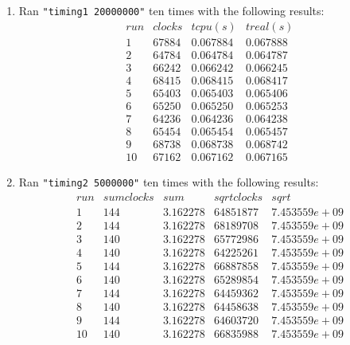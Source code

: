 \documentclass[12pt,fleqn,leqno,letterpaper]{article}
\begin{document}
\begin{enumerate}
    \item Ran \texttt{"timing1 20000000"} ten times with the following
        results:\\
        $$
        \begin{array}{lccc}
            run & clocks & t cpu (s) & t real (s) \\
            1 & 67884 & 0.067884 & 0.067888 \\
            2 & 64784 & 0.064784 & 0.064787 \\
            3 & 66242 & 0.066242 & 0.066245 \\
            4 & 68415 & 0.068415 & 0.068417 \\
            5 & 65403 & 0.065403 & 0.065406 \\
            6 & 65250 & 0.065250 & 0.065253 \\
            7 & 64236 & 0.064236 & 0.064238 \\
            8 & 65454 & 0.065454 & 0.065457 \\
            9 & 68738 & 0.068738 & 0.068742 \\
            10 & 67162 & 0.067162 & 0.067165
        \end{array}
        $$

    \item Ran \texttt{"timing2 5000000"} ten times with the following
        results:\\
        $$
        \begin{array}{lcccc}
            run & sum clocks & sum & sqrt clocks & sqrt \\
            1 & 144 & 3.162278 & 64851877 & 7.453559e+09 \\
            2 & 144 & 3.162278 & 68189708 & 7.453559e+09 \\
            3 & 140 & 3.162278 & 65772986 & 7.453559e+09 \\
            4 & 140 & 3.162278 & 64225261 & 7.453559e+09 \\
            5 & 144 & 3.162278 & 66887858 & 7.453559e+09 \\
            6 & 140 & 3.162278 & 65289854 & 7.453559e+09 \\
            7 & 144 & 3.162278 & 64459362 & 7.453559e+09 \\
            8 & 140 & 3.162278 & 64458638 & 7.453559e+09 \\
            9 & 144 & 3.162278 & 64603720 & 7.453559e+09 \\
            10 & 140 & 3.162278 & 66835988 & 7.453559e+09
        \end{array}
        $$


\end{enumerate}
\end{document}
